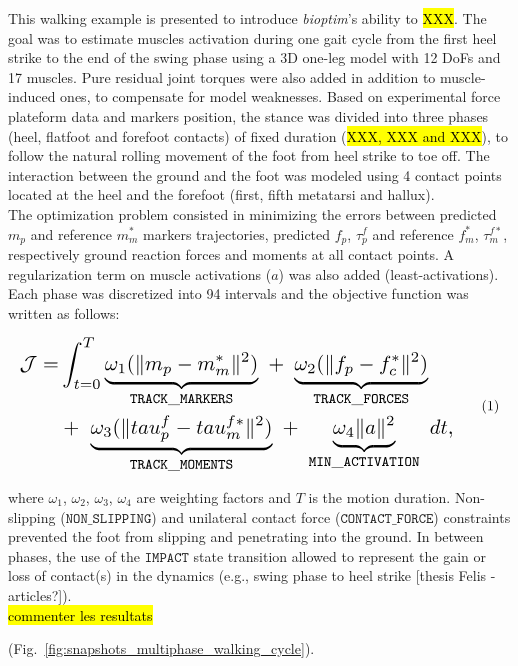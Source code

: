 This walking example is presented to introduce \textit{bioptim}'s ability to \hl{XXX}.
The goal was to estimate muscles activation during one gait cycle from the first heel strike to the end of the swing phase using a 3D one-leg model with 12 DoFs and 17 muscles. 
Pure residual joint torques were also added in addition to muscle-induced ones, to compensate for model weaknesses.
Based on experimental force plateform data and markers position, the stance was divided into three phases (heel, flatfoot and forefoot contacts) of fixed duration (\hl{XXX, XXX and XXX}), to follow the natural rolling movement of the foot from heel strike to toe off.
The interaction between the ground and the foot was modeled using 4 contact points located at the heel and the forefoot (first, fifth metatarsi and hallux).\\ 
The optimization problem consisted in minimizing the errors between predicted $m_p$ and reference $m_m^*$ markers trajectories, predicted $f_p$, $\tau^f_p$ and reference $f_m^*$, $\tau^{f*}_m$, respectively ground reaction forces and moments at all contact points.
A regularization term on muscle activations ($a$) was also added (least-activations).
Each phase was discretized into 94 intervals and the objective function was written as follows:

\[ 
\resizebox{0.9\columnwidth}{!}{$ 
\begin{aligned}
\mathcal{J} = &\int_{t=0}^{T}\underbrace{\omega_1(\|m_p - m^*_m\|^{2})}_{\mathtt{TRACK\_MARKERS}}~ 
+ ~ \underbrace{\omega_2(\|f_p - f^*_c\|^{2})}_{\mathtt{TRACK\_FORCES}}\\
&+ ~ \underbrace{\omega_3(\|tau^f_p - tau^{f*}_m\|^{2})}_{\mathtt{TRACK\_MOMENTS}}~
+ ~ \underbrace{\omega_4\|a\|^2}_{\mathtt{MIN\_ACTIVATION}}~dt, 
\end{aligned}  
$}
\addtag  
\label{eq:ocp_walk}  
\]  

where $\omega_1$, $\omega_2$, $\omega_3$, $\omega_4$ are weighting factors and $T$ is the motion duration.
Non-slipping ($\mathtt{NON\_SLIPPING}$) and unilateral contact force ($\mathtt{CONTACT\_FORCE}$) constraints prevented the foot from slipping and penetrating into the ground. 
In between phases, the use of the $\mathtt{IMPACT}$ state transition allowed to represent the gain or loss of contact(s) in the dynamics (e.g., swing phase to heel strike [thesis Felis - articles?]).\\

\hl{commenter les resultats}

(Fig.~\ref{fig:snapshots_multiphase_walking_cycle}). 

